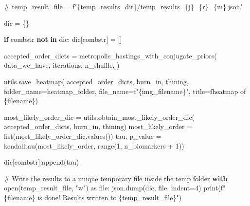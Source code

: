 \documentclass[
  letterpaper,
  DIV=11,
  numbers=noendperiod]{scrreprt}
\newenvironment{Shaded}{\begin{snugshade}}{\end{snugshade}}
\newcommand{\BuiltInTok}[1]{\textcolor[rgb]{0.00,0.23,0.31}{#1}}
\newcommand{\CommentTok}[1]{\textcolor[rgb]{0.37,0.37,0.37}{#1}}
\newcommand{\ControlFlowTok}[1]{\textcolor[rgb]{0.00,0.23,0.31}{\textbf{#1}}}
\newcommand{\DecValTok}[1]{\textcolor[rgb]{0.68,0.00,0.00}{#1}}
\newcommand{\ImportTok}[1]{\textcolor[rgb]{0.00,0.46,0.62}{#1}}
\newcommand{\KeywordTok}[1]{\textcolor[rgb]{0.00,0.23,0.31}{\textbf{#1}}}
\newcommand{\NormalTok}[1]{\textcolor[rgb]{0.00,0.23,0.31}{#1}}
\newcommand{\OperatorTok}[1]{\textcolor[rgb]{0.37,0.37,0.37}{#1}}
\newcommand{\SpecialCharTok}[1]{\textcolor[rgb]{0.37,0.37,0.37}{#1}}
\newcommand{\SpecialStringTok}[1]{\textcolor[rgb]{0.13,0.47,0.30}{#1}}
\newcommand{\StringTok}[1]{\textcolor[rgb]{0.13,0.47,0.30}{#1}}
\begin{document}
\begin{Shaded}
\begin{Highlighting}[]
    \CommentTok{\# temp\_result\_file = f"\{temp\_results\_dir\}/temp\_results\_\{j\}\_\{r\}\_\{m\}.json"}
    
\NormalTok{    dic }\OperatorTok{=}\NormalTok{ \{\}}

    \ControlFlowTok{if}\NormalTok{ combstr }\KeywordTok{not} \KeywordTok{in}\NormalTok{ dic:}
\NormalTok{        dic[combstr] }\OperatorTok{=}\NormalTok{ []}

\NormalTok{    accepted\_order\_dicts }\OperatorTok{=}\NormalTok{ metropolis\_hastings\_with\_conjugate\_priors(}
\NormalTok{        data\_we\_have,}
\NormalTok{        iterations,}
\NormalTok{        n\_shuffle,}
\NormalTok{    )}

\NormalTok{    utils.save\_heatmap(}
\NormalTok{        accepted\_order\_dicts,}
\NormalTok{        burn\_in, }
\NormalTok{        thining, }
\NormalTok{        folder\_name}\OperatorTok{=}\NormalTok{heatmap\_folder,}
\NormalTok{        file\_name}\OperatorTok{=}\SpecialStringTok{f"}\SpecialCharTok{\{}\NormalTok{img\_filename}\SpecialCharTok{\}}\SpecialStringTok{"}\NormalTok{, }
\NormalTok{        title}\OperatorTok{=}\SpecialStringTok{f\textquotesingle{}heatmap of }\SpecialCharTok{\{}\NormalTok{filename}\SpecialCharTok{\}}\SpecialStringTok{\textquotesingle{}}\NormalTok{)}
    
\NormalTok{    most\_likely\_order\_dic }\OperatorTok{=}\NormalTok{ utils.obtain\_most\_likely\_order\_dic(}
\NormalTok{        accepted\_order\_dicts, burn\_in, thining)}
\NormalTok{    most\_likely\_order }\OperatorTok{=} \BuiltInTok{list}\NormalTok{(most\_likely\_order\_dic.values())}
\NormalTok{    tau, p\_value }\OperatorTok{=}\NormalTok{ kendalltau(most\_likely\_order, }\BuiltInTok{range}\NormalTok{(}\DecValTok{1}\NormalTok{, n\_biomarkers }\OperatorTok{+} \DecValTok{1}\NormalTok{))}
    
\NormalTok{    dic[combstr].append(tau)}
    
    \CommentTok{\# Write the results to a unique temporary file inside the temp folder}
    \ControlFlowTok{with} \BuiltInTok{open}\NormalTok{(temp\_result\_file, }\StringTok{"w"}\NormalTok{) }\ImportTok{as} \BuiltInTok{file}\NormalTok{:}
\NormalTok{        json.dump(dic, }\BuiltInTok{file}\NormalTok{, indent}\OperatorTok{=}\DecValTok{4}\NormalTok{)}
    \BuiltInTok{print}\NormalTok{(}\SpecialStringTok{f"}\SpecialCharTok{\{}\NormalTok{filename}\SpecialCharTok{\}}\SpecialStringTok{ is done! Results written to }\SpecialCharTok{\{}\NormalTok{temp\_result\_file}\SpecialCharTok{\}}\SpecialStringTok{"}\NormalTok{)}
\end{Highlighting}
\end{Shaded}
\end{document}
